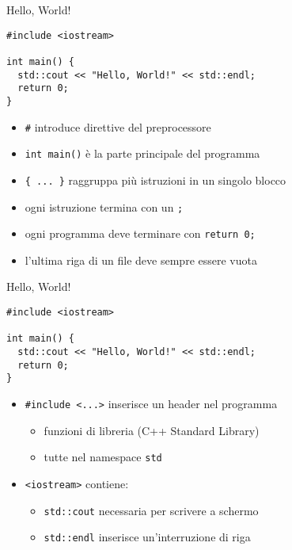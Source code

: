 \documentclass[xcolor=dvipsnames,handout]{beamer}
\begin{document}
\begin{frame}[fragile]{Hello, World!}
  \vfill
  \begin{lstlisting}
#include <iostream>

int main() {
  std::cout << "Hello, World!" << std::endl;
  return 0;
}
  \end{lstlisting}
  \vfill
  \begin{itemize}
    \item \lstinline$#$ introduce direttive del preprocessore
    \vfill
    \item \lstinline$int main()$ è la parte principale del programma
    \vfill
    \item \lstinline${ ... }$ raggruppa più istruzioni in un singolo blocco
    \vfill
    \item ogni istruzione termina con un \lstinline$;$
    \vfill
    \item ogni programma deve terminare con \lstinline$return 0;$
    \vfill
    \item l'ultima riga di un file deve sempre essere vuota
  \end{itemize}
  \vfill
\end{frame}

\begin{frame}[fragile]{Hello, World!}
  \vfill
  \begin{lstlisting}
#include <iostream>

int main() {
  std::cout << "Hello, World!" << std::endl;
  return 0;
}
  \end{lstlisting}
  \vfill
  \begin{itemize}
    \item \lstinline$#include <...>$ inserisce un \alert{header} nel programma
    \begin{itemize}
      \item funzioni di libreria (C++ Standard Library)
      \item tutte nel \alert{namespace} \lstinline$std$
    \end{itemize}
    \vfill
    \item \lstinline$<iostream>$ contiene:
    \begin{itemize}
      \item \lstinline$std::cout$ necessaria per scrivere a schermo
      \item \lstinline$std::endl$ inserisce un'interruzione di riga
    \end{itemize}
  \end{itemize}
  \vfill
\end{frame}
\end{document}
